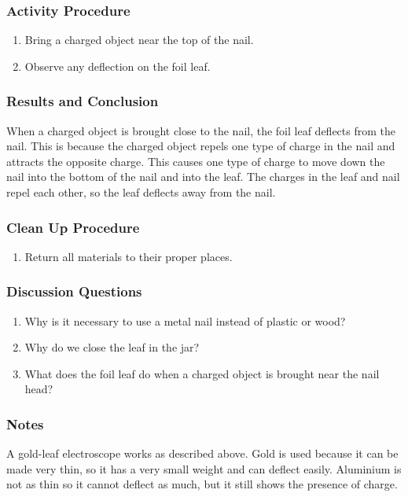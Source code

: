 \subsubsection*{Activity Procedure}
\begin{enumerate}
\item{Bring a charged object near the top of the nail.} 
\item{Observe any deflection on the foil leaf.} 
\end{enumerate}

\subsubsection*{Results and Conclusion}
When a charged object is brought close to the nail, the foil leaf deflects from the nail. This is because the charged object repels one type of charge in the nail and attracts the opposite charge. This causes one type of charge to move down the nail into the bottom of the nail and into the leaf. The charges in the leaf and nail repel each other, so the leaf deflects away from the nail. 

\subsubsection*{Clean Up Procedure}
\begin{enumerate}
\item{Return all materials to their proper places.} 
\end{enumerate}

\subsubsection*{Discussion Questions}
\begin{enumerate}
\item{Why is it necessary to use a metal nail instead of plastic or wood?}
\item{Why do we close the leaf in the jar?}
\item{What does the foil leaf do when a charged object is brought near the nail head?}
\end{enumerate}

\subsubsection*{Notes}
A gold-leaf electroscope works as described above. Gold is used because it can be made very thin, so it has a very small weight and can deflect easily. Aluminium is not as thin so it cannot deflect as much, but it still shows the presence of charge. 

